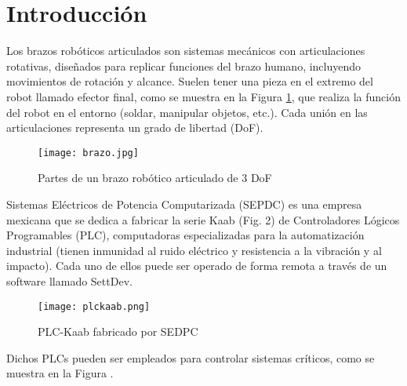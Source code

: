 \section{Introducci\'on}

Los brazos robóticos articulados son sistemas mecánicos con articulaciones rotativas, diseñados para replicar funciones del brazo humano, incluyendo movimientos de rotación y alcance. Suelen tener una pieza en el extremo del robot llamado efector final, como se muestra en la Figura \ref{fig:brazoR}, que realiza la función del robot en el entorno (soldar, manipular objetos, etc.). Cada unión en las articulaciones representa un grado de libertad (DoF).

\begin{figure}[htb]
	\centering
	\texttt{[image: brazo.jpg]}
	\caption{Partes de un brazo robótico articulado de 3 DoF}
	\label{fig:brazoR}
\end{figure}

Sistemas Eléctricos de Potencia Computarizada (SEPDC) es una empresa mexicana que se dedica a fabricar la serie Kaab (Fig. 2) de Controladores Lógicos Programables (PLC), computadoras especializadas para la automatización industrial (tienen inmunidad al ruido eléctrico y resistencia a la vibración y al impacto). Cada uno de ellos puede ser operado de forma remota a través de un software llamado SettDev.

\begin{figure}[htb]
	\centering
	\texttt{[image: plckaab.png]}
	\caption{PLC-Kaab fabricado por SEDPC}
\end{figure}

Dichos PLCs pueden ser empleados para controlar sistemas críticos, como se muestra en la Figura .